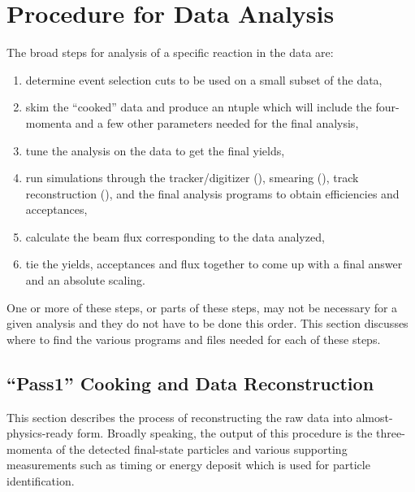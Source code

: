 \section{\label{sec:data}Procedure for Data Analysis}


The broad steps for analysis of a specific reaction in the  data are:
\begin{enumerate}
    \item determine event selection cuts to be used on a small subset of the data,
    \item skim the ``cooked'' data and produce an ntuple which will include the four-momenta and a few other parameters needed for the final analysis,
    \item tune the analysis on the data to get the final yields,
    \item run simulations through the tracker/digitizer (), smearing (), track reconstruction (), and the final analysis programs to obtain efficiencies and acceptances,
    \item calculate the beam flux corresponding to the data analyzed,
    \item tie the yields, acceptances and flux together to come up with a final answer and an absolute scaling.
\end{enumerate}
One or more of these steps, or parts of these steps, may not be necessary for a given analysis and they do not have to be done this order. This section discusses where to find the various programs and files needed for each of these steps.

\subsection{\label{sec:data.cook}``Pass1'' Cooking and Data Reconstruction}

This section describes the process of reconstructing the raw data into almost-physics-ready form. Broadly speaking, the output of this procedure is the three-momenta of the detected final-state particles and various supporting measurements such as timing or energy deposit which is used for particle identification.

